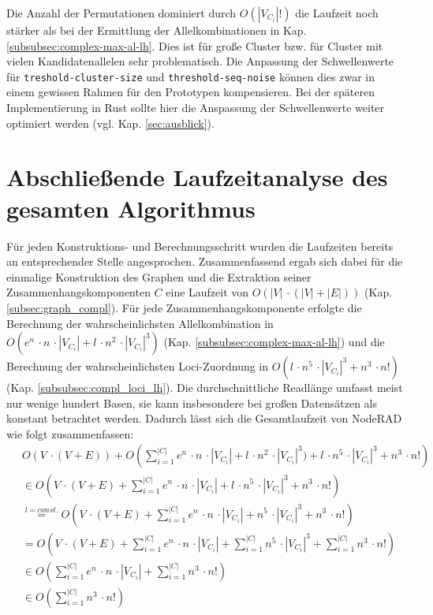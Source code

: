 Die Anzahl der Permutationen dominiert durch $ O(|V_{C_{i}}|!) $ die Laufzeit noch stärker als bei der Ermittlung der Allelkombinationen in Kap. \ref{subsubsec:complex-max-al-lh}. Dies ist für große Cluster bzw. für Cluster mit vielen Kandidatenallelen sehr problematisch. Die Anpassung der Schwellenwerte für \lstinline|treshold-cluster-size| und  \lstinline|threshold-seq-noise| können dies zwar in einem gewissen Rahmen für den Prototypen kompensieren. Bei der späteren Implementierung in Rust sollte hier die Anspassung der Schwellenwerte weiter optimiert werden (vgl. Kap. \ref{sec:ausblick}).

\section[Gesamtlaufzeit des Algorithmus]{Abschließende Laufzeitanalyse des gesamten Algorithmus}

Für jeden Konstruktions- und Berechnungsschritt wurden die Laufzeiten bereits an entsprechender Stelle angesprochen. Zusammenfassend ergab sich dabei für die einmalige Konstruktion des Graphen und die Extraktion seiner Zusammenhangskomponenten $ C $ eine Laufzeit von $O(|V| \, \cdotp (|V| + |E|)) $ (Kap. \ref{subsec:graph_compl}). Für jede Zusammenhangskomponente erfolgte die Berechnung der wahrscheinlichsten Allelkombination in $ O( e^n\, \cdotp n\, \cdotp |V_{C_{i}}| + l\, \cdotp n^2\, \cdotp |V_{C_{i}}|^3) $ (Kap. \ref{subsubsec:complex-max-al-lh}) und die Berechnung der wahrscheinlichsten Loci-Zuordnung in $O( l\, \cdotp n^5  \, \cdotp |V_{C_{i}}|^3 + n^3  \, \cdotp n!)$ (Kap. \ref{subsubsec:compl_loci_lh}). Die durchschnittliche Readlänge umfasst meist nur wenige hundert Basen, sie kann insbesondere bei großen Datensätzen als konstant betrachtet werden. Dadurch lässt sich die Gesamtlaufzeit von NodeRAD wie folgt zusammenfassen:
\begin{equation} \label{eqn:4-26}
\tag{4-26}
\begin{aligned}
&\ {}O(V \, \cdotp (V + E)) + O\left( \sum_{i=1}^{|C|} e^n\, \cdotp n\, \cdotp |V_{C_{i}}| + l\, \cdotp n^2\, \cdotp |V_{C_{i}}|^3) + l\, \cdotp n^5  \, \cdotp |V_{C_{i}}|^3 + n^3  \, \cdotp n! \right) \\
&\ \in O\left( V \, \cdotp (V + E) + \sum_{i=1}^{|C|} e^n\, \cdotp n\, \cdotp |V_{C_{i}}| + l\, \cdotp n^5  \, \cdotp |V_{C_{i}}|^3 + n^3  \, \cdotp n! \right) \\
&\ \stackrel{l = const.}{=} O\left( V \, \cdotp (V + E) + \sum_{i=1}^{|C|} e^n\, \cdotp n\, \cdotp |V_{C_{i}}| + n^5  \, \cdotp |V_{C_{i}}|^3 + n^3  \, \cdotp n! \right) \\
&\ = O\left( V \, \cdotp (V + E) + \sum_{i=1}^{|C|} e^n\, \cdotp n\, \cdotp |V_{C_{i}}| + \sum_{i=1}^{|C|} n^5  \, \cdotp |V_{C_{i}}|^3 + \sum_{i=1}^{|C|} n^3  \, \cdotp n! \right) \\
&\ \in O\left(\sum_{i=1}^{|C|} e^n\, \cdotp n\, \cdotp |V_{C_{i}}| + \sum_{i=1}^{|C|} n^3  \, \cdotp n! \right) \\
&\ \in O\left(\sum_{i=1}^{|C|} n^3  \, \cdotp n! \right) \\
\end{aligned}
\end{equation}

